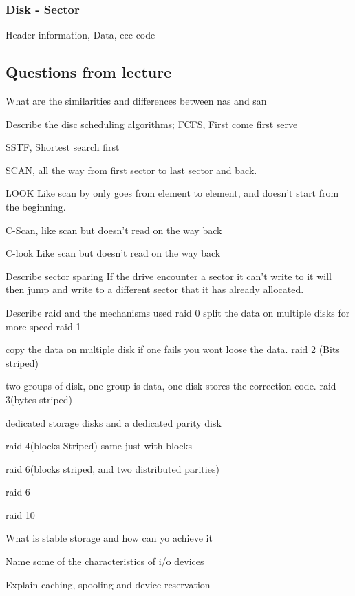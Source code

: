 \documentclass[a4paper,10pt,titlepage]{report}
\begin{document}
\subsubsection{Disk - Sector}
Header information, Data, ecc code \\






\subsection{Questions from lecture}
	What are the similarities and differences between nas and san

	Describe the disc scheduling algorithms; 
		FCFS, 
		First come first serve
		
		SSTF,
		Shortest search first
			
		SCAN, 
		all the way from first sector to last sector and back.
		
		LOOK
		Like scan by only goes from element to element, and doesn't start from the beginning.
		
		
		
	
		C-Scan, 
		like scan but doesn't read on the way back
		
		
		C-look		
		Like scan  but doesn't read on the way back
		
	Describe sector sparing
		If the drive encounter a sector it can't write to it will then jump and write to a different sector that it has already allocated.
	
	Describe raid and the mechanisms used
	raid 0
		split the data on multiple disks for more speed
	raid 1
	
		copy the data on multiple disk if one fails you wont loose the data.
	raid 2 (Bits striped)
	
	two groups of disk, one group is data, one disk stores the correction code.
	raid 3(bytes striped)
	
		dedicated storage disks and a dedicated parity disk
		
	raid 4(blocks Striped)
	same just with blocks
	
	raid 6(blocks striped, and two distributed parities)
	
	raid 6
	
	raid 10
	
	What is stable storage and how can yo achieve it
	
	Name some of the characteristics of i/o devices
	
	Explain caching, spooling and device reservation
	
\end{document}
